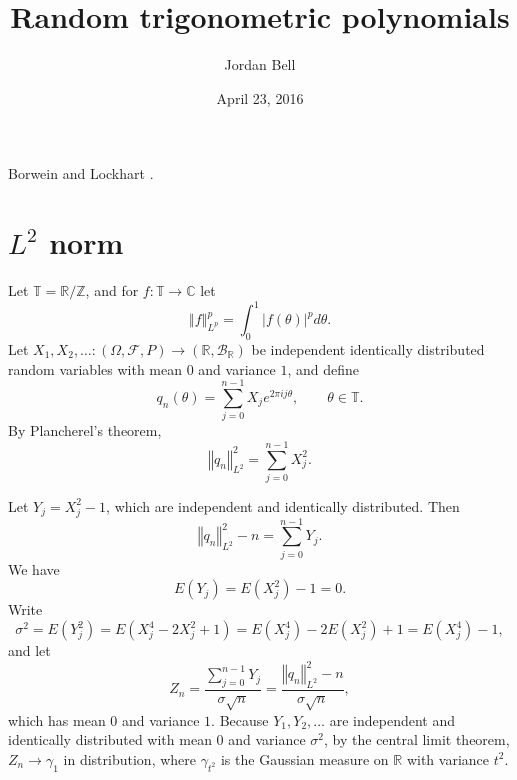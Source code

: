 \documentclass{article}
\newcommand{\norm}[1]{\left\Vert #1 \right\Vert}
\begin{document}
\title{Random trigonometric polynomials}
\author{Jordan Bell}
\date{April 23, 2016}
\maketitle


Borwein and Lockhart \cite{MR1814174}. 

\section{$L^2$ norm}
Let $\mathbb{T}=\mathbb{R}/\mathbb{Z}$, and for $f:\mathbb{T} \to \mathbb{C}$ let
\[
\norm{f}_{L^p}^p =  \int_0^1 |f(\theta)|^p d\theta.
\]
Let $X_1,X_2,\ldots:(\Omega,\mathscr{F},P) \to (\mathbb{R},\mathscr{B}_{\mathbb{R}})$ be 
independent identically distributed random variables with mean $0$ and variance $1$, and define
\[
q_n(\theta) = \sum_{j=0}^{n-1} X_j e^{2\pi ij\theta},\qquad \theta \in \mathbb{T}.
\]
By Plancherel's theorem,
\[
\norm{q_n}_{L^2}^2 = \sum_{j=0}^{n-1} X_j^2.
\]

Let $Y_j=X_j^2-1$, which are independent and identically distributed.
Then
\[
\norm{q_n}_{L^2}^2-n = \sum_{j=0}^{n-1} Y_j.
\]
We have
\[
E(Y_j) = E(X_j^2)-1 = 0.
\]
Write
\[
\sigma^2 = E(Y_j^2) = E(X_j^4-2X_j^2+1) = E(X_j^4) - 2E(X_j^2) + 1 = E(X_j^4) - 1,
\]
and let
\[
Z_n =
\frac{\sum_{j=0}^{n-1} Y_j}{\sigma \sqrt{n}}
= \frac{\norm{q_n}_{L^2}^2-n}{\sigma \sqrt{n}},
\]
which has mean $0$ and variance $1$. 
Because $Y_1,Y_2,\ldots$ are independent and identically distributed with mean $0$ and variance $\sigma^2$,
by the central limit theorem, $Z_n \to \gamma_1$ in distribution, where $\gamma_{t^2}$ is the Gaussian measure
on $\mathbb{R}$ with variance $t^2$. 
\end{document}
